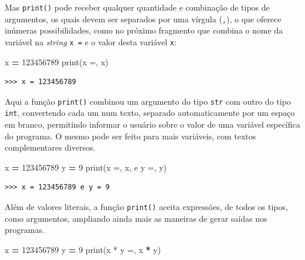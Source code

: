\documentclass[
]{book}
\newenvironment{Shaded}{\begin{snugshade}}{\end{snugshade}}
\newcommand{\BuiltInTok}[1]{#1}
\newcommand{\DecValTok}[1]{\textcolor[rgb]{0.00,0.00,0.81}{#1}}
\newcommand{\NormalTok}[1]{#1}
\newcommand{\OperatorTok}[1]{\textcolor[rgb]{0.81,0.36,0.00}{\textbf{#1}}}
\newcommand{\StringTok}[1]{\textcolor[rgb]{0.31,0.60,0.02}{#1}}
\begin{document}
Mas \texttt{print()} pode receber qualquer quantidade e combinação de tipos de argumentos, os quais devem ser separados por uma vírgula (\texttt{,}), o que oferece inúmeras possibilidades, como no próximo fragmento que combina o nome da variável na \emph{string} \texttt{\textquotesingle{}x\ =\textquotesingle{}} e o valor desta variável \texttt{x}:

\begin{Shaded}
\begin{Highlighting}[]
\NormalTok{x }\OperatorTok{=} \DecValTok{123456789}
\BuiltInTok{print}\NormalTok{(}\StringTok{\textquotesingle{}x =\textquotesingle{}}\NormalTok{, x)}
\end{Highlighting}
\end{Shaded}

\begin{verbatim}
>>> x = 123456789
\end{verbatim}

Aqui a função \texttt{print()} combinou um argumento do tipo \texttt{str} com outro do tipo \texttt{int}, convertendo cada um num texto, separado automaticamente por um espaço em branco, permitindo informar o usuário sobre o valor de uma variável específica do programa. O mesmo pode ser feito para mais variáveis, com textos complementares diversos.

\begin{Shaded}
\begin{Highlighting}[]
\NormalTok{x }\OperatorTok{=} \DecValTok{123456789}
\NormalTok{y }\OperatorTok{=} \DecValTok{9}
\BuiltInTok{print}\NormalTok{(}\StringTok{\textquotesingle{}x =\textquotesingle{}}\NormalTok{, x, }\StringTok{\textquotesingle{}e y =\textquotesingle{}}\NormalTok{, y)}
\end{Highlighting}
\end{Shaded}

\begin{verbatim}
>>> x = 123456789 e y = 9
\end{verbatim}

Além de valores literais, a função \texttt{print()} aceita expressões, de todos os tipos, como argumentos, ampliando ainda mais as maneiras de gerar saídas nos programas.

\begin{Shaded}
\begin{Highlighting}[]
\NormalTok{x }\OperatorTok{=} \DecValTok{123456789}
\NormalTok{y }\OperatorTok{=} \DecValTok{9}
\BuiltInTok{print}\NormalTok{(}\StringTok{\textquotesingle{}x * y =\textquotesingle{}}\NormalTok{, x }\OperatorTok{*}\NormalTok{ y)}
\end{Highlighting}
\end{Shaded}
\end{document}
